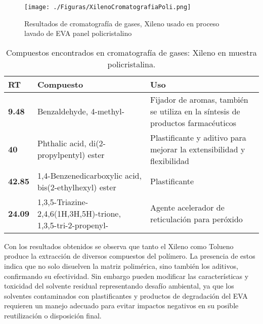 \begin{figure}[htb]
	\begin{center}
		\texttt{[image: ./Figuras/XilenoCromatografiaPoli.png]}
	\end{center}
	\vspace{-1em} %
	\caption{Resultados de cromatografía de gases, Xileno usado en proceso lavado de EVA panel policristalino}
	\label{fig:XilenoPoliCromatografia}
\end{figure}


\begin{table}[htb]
	\caption{Compuestos encontrados en cromatografía de gases: Xileno en muestra policristalina.}
	\vspace{-0.5em} %
	\label{tab:cromatografiaxilenopoli}
	\begin{center}
		\begin{tabular}{|p{3cm}||p{4cm}|p{5cm}|}\hline
			\textbf{RT} & \textbf{Compuesto} & \textbf{Uso}\\ \hline
			\textbf{9.48} & Benzaldehyde, 4-methyl- & Fijador de aromas, también se utiliza en la síntesis de productos farmacéuticos  \\ \hline
			\textbf{40} & Phthalic acid, di(2-propylpentyl) ester & Plastificante y aditivo para mejorar la extensibilidad y flexibilidad\\ \hline
			\textbf{42.85} & 1,4-Benzenedicarboxylic acid, bis(2-ethylhexyl) ester & Plastificante \\ \hline
			\textbf{24.09} & 1,3,5-Triazine-2,4,6(1H,3H,5H)-trione, 1,3,5-tri-2-propenyl- & Agente acelerador de reticulación para peróxido\\ \hline	
		\end{tabular}
	\end{center}
\end{table} 

Con los resultados obtenidos se observa que tanto el Xileno como Tolueno produce la extracción de diversos compuestos del polímero. La presencia de estos indica que no solo disuelven la matriz polimérica, sino también los aditivos, confirmando su efectividad. Sin embargo pueden modificar las características y toxicidad del solvente residual representando desafío ambiental, ya que los solventes contaminados con plastificantes y productos de degradación del EVA requieren un manejo adecuado para evitar impactos negativos en su posible reutilización o disposición final.

